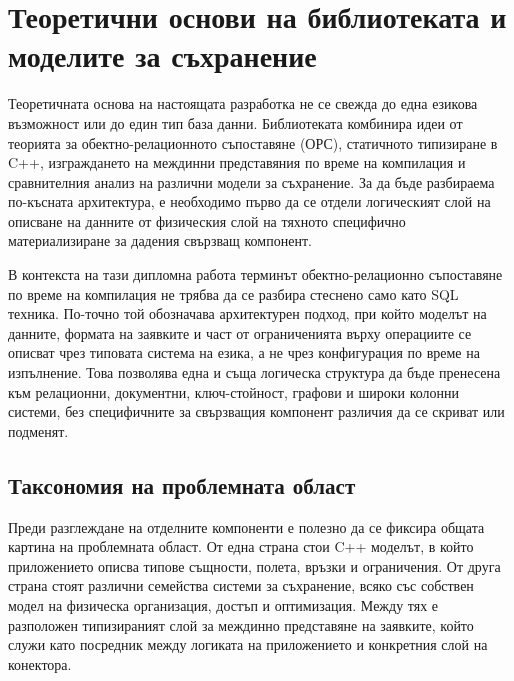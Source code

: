 \section{Теоретични основи на библиотеката и моделите за съхранение}
\label{sec:theoretical_background}

Теоретичната основа на настоящата разработка не се свежда до една езикова възможност или до един тип база данни. Библиотеката комбинира идеи от теорията за обектно-релационното съпоставяне (ОРС), статичното типизиране в C++, изграждането на междинни представяния по време на компилация и сравнителния анализ на различни модели за съхранение. За да бъде разбираема по-късната архитектура, е необходимо първо да се отдели логическият слой на описване на данните от физическия слой на тяхното специфично материализиране за дадения свързващ компонент.

В контекста на тази дипломна работа терминът обектно-релационно съпоставяне по време на компилация не трябва да се разбира стеснено само като SQL техника. По-точно той обозначава архитектурен подход, при който моделът на данните, формата на заявките и част от ограниченията върху операциите се описват чрез типовата система на езика, а не чрез конфигурация по време на изпълнение. Това позволява една и съща логическа структура да бъде пренесена към релационни, документни, ключ-стойност, графови и широки колонни системи, без специфичните за свързващия компонент различия да се скриват или подменят.

\subsection{Таксономия на проблемната област}

Преди разглеждане на отделните компоненти е полезно да се фиксира общата картина на проблемната област. От една страна стои C++ моделът, в който приложението описва типове същности, полета, връзки и ограничения. От друга страна стоят различни семейства системи за съхранение, всяко със собствен модел на физическа организация, достъп и оптимизация. Между тях е разположен типизираният слой за междинно представяне на заявките, който служи като посредник между логиката на приложението и конкретния слой на конектора.

